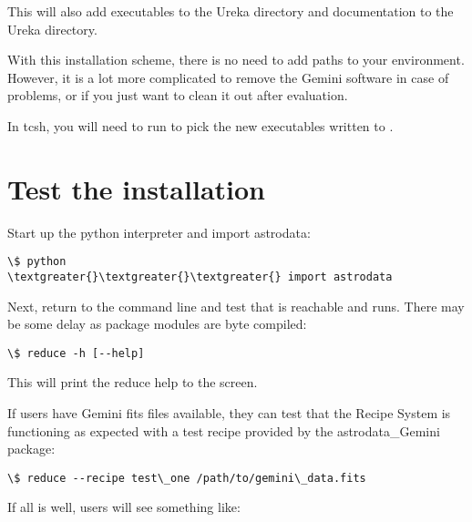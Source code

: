 \documentclass[letterpaper,10pt,english]{sphinxmanual}
\begin{document}
This will also add executables to the Ureka  directory and documentation to
the Ureka  directory.

With this installation scheme, there is no need to add paths to your environment.
However, it is a lot more complicated to remove the Gemini software in case of
problems, or if you just want to clean it out after evaluation.

In tcsh, you will need to run  to pick the new executables written to
.


\section{Test the installation}
\label{userenv:test}\label{userenv:test-the-installation}
Start up the python interpreter and import astrodata:

\begin{Verbatim}[commandchars=\\\{\}]
\$ python
\textgreater{}\textgreater{}\textgreater{} import astrodata
\end{Verbatim}

Next, return to the command line and test that  is reachable
and runs. There may be some delay as package modules are byte compiled:

\begin{Verbatim}[commandchars=\\\{\}]
\$ reduce -h [--help]
\end{Verbatim}

This will print the reduce help to the screen.

If users have Gemini fits files available, they can test that the Recipe System
is functioning as expected with a test recipe provided by the astrodata\_Gemini
package:

\begin{Verbatim}[commandchars=\\\{\}]
\$ reduce --recipe test\_one /path/to/gemini\_data.fits
\end{Verbatim}

If all is well, users will see something like:
\end{document}

